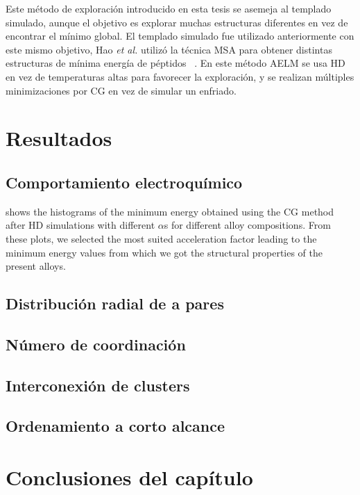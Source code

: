 Este método de exploración introducido en esta tesis se asemeja al templado
simulado, aunque el objetivo es explorar muchas estructuras diferentes en vez de 
encontrar el mínimo global. El templado simulado fue utilizado anteriormente
con este mismo objetivo, Hao \textit{et al.} utilizó la técnica MSA para obtener
distintas estructuras de mínima energía de péptidos ~\cite{hao2015}. En este 
método AELM se usa HD en vez de temperaturas altas para favorecer la exploración,
y se realizan múltiples minimizaciones por CG en vez de simular un enfriado. 


\section{Resultados}

\subsection{Comportamiento electroquímico}

shows the histograms of the minimum energy obtained using the CG method after HD 
simulations with different $\alpha$s for different alloy compositions. From these 
plots, we selected the most suited acceleration factor leading to the minimum 
energy values from which we got the structural properties of the present alloys. 

\subsection{Distribución radial de a pares}
\subsection{Número de coordinación}
\subsection{Interconexión de clusters}
\subsection{Ordenamiento a corto alcance}


\section{Conclusiones del capítulo}
